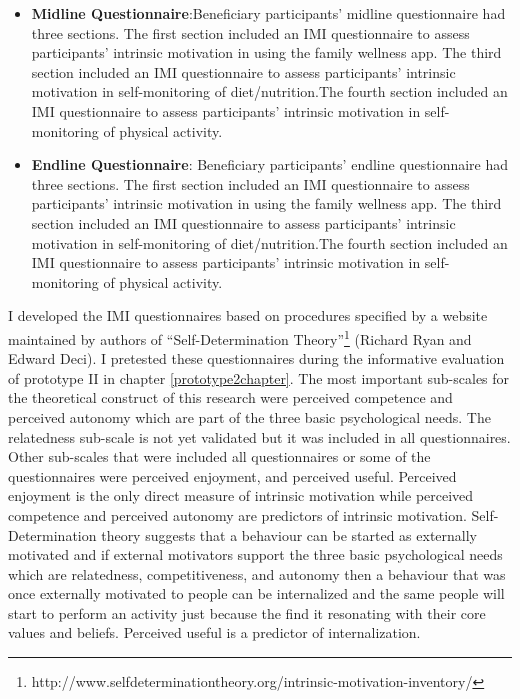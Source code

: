 \begin{enumerate}
\begin{itemize}
\item{\textbf{Midline Questionnaire}}:Beneficiary participants' midline questionnaire had three sections. The first section included an IMI questionnaire  to assess participants' intrinsic motivation in using the family wellness app. The third section included an IMI questionnaire to assess participants' intrinsic motivation in self-monitoring of diet/nutrition.The fourth section included an IMI questionnaire to assess participants' intrinsic motivation in self-monitoring of physical activity.

\item{\textbf{Endline Questionnaire}}: Beneficiary participants' endline questionnaire had three sections. The first section included an IMI questionnaire  to assess participants' intrinsic motivation in using the family wellness app. The third section included an IMI questionnaire to assess participants' intrinsic motivation in self-monitoring of diet/nutrition.The fourth section included an IMI questionnaire to assess participants' intrinsic motivation in self-monitoring of physical activity.
\end{itemize}
\end{enumerate}

I developed the IMI questionnaires based on procedures specified by a website maintained by authors of ``Self-Determination Theory''\footnote{http://www.selfdeterminationtheory.org/intrinsic-motivation-inventory/} (Richard Ryan and Edward Deci\citep{deci1985intrinsic}). I pretested these questionnaires during the informative evaluation of prototype II in chapter \ref{prototype2chapter}. The most important sub-scales for the theoretical construct of this research were perceived competence and perceived autonomy which are part of the three basic psychological needs. The relatedness sub-scale is not yet validated but it was included in all questionnaires. Other sub-scales that were included all questionnaires or some of the questionnaires were perceived enjoyment, and perceived useful. Perceived enjoyment is the only direct measure of intrinsic motivation while perceived competence and perceived autonomy are predictors of intrinsic motivation. Self-Determination theory suggests that a behaviour can be started as externally motivated and if external motivators support the three basic psychological needs which are relatedness, competitiveness, and autonomy then a behaviour that was once externally motivated to people can be internalized and the same people will start to perform an activity just because the find it resonating with their core values and beliefs. Perceived useful is a predictor of internalization.

